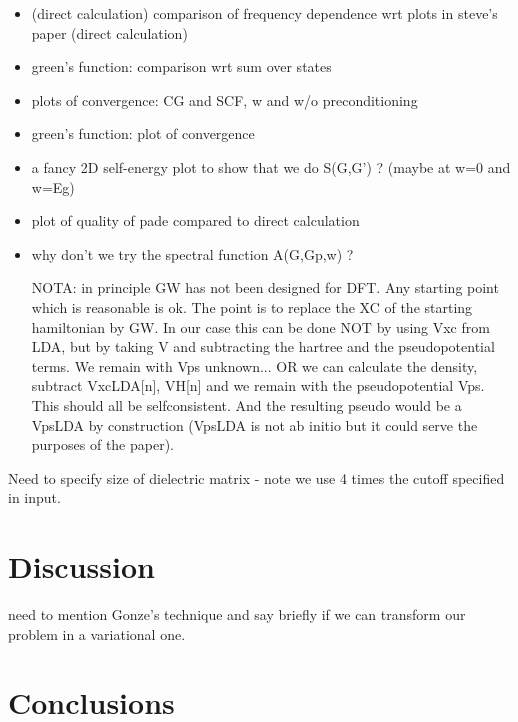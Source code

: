 \documentclass[twocolumn,prb,showpacs,superscriptaddress]{revtex4}
\begin{document}
\begin{itemize}

\item
(direct calculation)
comparison of frequency dependence wrt plots in steve's paper
(direct calculation)

\item
green's function: comparison wrt sum over states

\item
plots of convergence: CG and SCF, w and w/o preconditioning

\item
green's function: plot of convergence

\item
a fancy 2D self-energy plot to show that we do S(G,G') ?
(maybe at w=0 and w=Eg)

\item
plot of quality of pade compared to direct calculation

\item
why don't we try the spectral function A(G,Gp,w) ?

NOTA: in principle GW has not been designed for DFT. Any starting
point which is reasonable is ok. The point is to replace the XC
of the starting hamiltonian by GW. In our case this can be done
NOT by using Vxc from LDA, but by taking V and subtracting the
hartree and the pseudopotential terms. We remain with Vps unknown...
OR we can calculate the density, subtract VxcLDA[n], VH[n] and
we remain with the pseudopotential Vps. This should all be selfconsistent.
And the resulting pseudo would be a VpsLDA by construction
(VpsLDA is not ab initio but it could serve the purposes of the paper).

\end{itemize}

Need to specify size of dielectric matrix - note we use 4 times the cutoff
specified in input.

\section{Discussion}\label{sec.discussion}

need to mention Gonze's technique and say briefly if we can transform our problem
in a variational one.

\section{Conclusions}\label{sec.conclusions}
\end{document}
